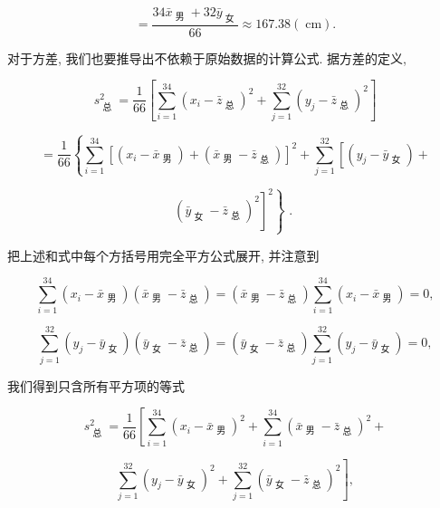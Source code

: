 \documentclass[10pt]{article}
\begin{document}
\[
= \frac{{34}{\bar{x}}_{\text{ 男 }} + {32}{\bar{y}}_{\text{ 女 }}}{66} \approx  {167.38}\left( \mathrm{\;{cm}}\right) .
\]

对于方差, 我们也要推导出不依赖于原始数据的计算公式. 据方差的定义,

\[
{s}_{\text{ 总 }}^{2} = \frac{1}{66}\left\lbrack  {\mathop{\sum }\limits_{{i = 1}}^{{34}}{\left( {x}_{i} - {\bar{z}}_{\text{ 总 }}\right) }^{2} + \mathop{\sum }\limits_{{j = 1}}^{{32}}{\left( {y}_{j} - {\bar{z}}_{\text{ 总 }}\right) }^{2}}\right\rbrack
\]

\[
= \frac{1}{66}\left\{  {\mathop{\sum }\limits_{{i = 1}}^{{34}}{\left\lbrack  \left( {x}_{i} - {\bar{x}}_{\text{ 男 }}\right)  + \left( {\bar{x}}_{\text{ 男 }} - {\bar{z}}_{\text{ 总 }}\right) \right\rbrack  }^{2} + \mathop{\sum }\limits_{{j = 1}}^{{32}}\left\lbrack  {\left( {{y}_{j} - {\bar{y}}_{\text{ 女 }}}\right)  + }\right. }\right.
\]

\[
\left. {\left. {\left( {\bar{y}}_{\text{ 女 }} - {\bar{z}}_{\text{ 总 }}\right) }^{2}\right\rbrack  }^{2}\right\}  \text{ . }
\]

把上述和式中每个方括号用完全平方公式展开, 并注意到

\[
\mathop{\sum }\limits_{{i = 1}}^{{34}}\left( {{x}_{i} - {\bar{x}}_{\text{ 男 }}}\right) \left( {{\bar{x}}_{\text{ 男 }} - {\bar{z}}_{\text{ 总 }}}\right)  = \left( {{\bar{x}}_{\text{ 男 }} - {\bar{z}}_{\text{ 总 }}}\right) \mathop{\sum }\limits_{{i = 1}}^{{34}}\left( {{x}_{i} - {\bar{x}}_{\text{ 男 }}}\right)  = 0,
\]

\[
\mathop{\sum }\limits_{{j = 1}}^{{32}}\left( {{y}_{j} - {\bar{y}}_{\text{ 女 }}}\right) \left( {{\bar{y}}_{\text{ 女 }} - {\bar{z}}_{\text{ 总 }}}\right)  = \left( {{\bar{y}}_{\text{ 女 }} - {\bar{z}}_{\text{ 总 }}}\right) \mathop{\sum }\limits_{{j = 1}}^{{32}}\left( {{y}_{j} - {\bar{y}}_{\text{ 女 }}}\right)  = 0,
\]

我们得到只含所有平方项的等式

\[
{s}_{\text{ 总 }}^{2} = \frac{1}{66}\left\lbrack  {\mathop{\sum }\limits_{{i = 1}}^{{34}}{\left( {x}_{i} - {\bar{x}}_{\text{ 男 }}\right) }^{2} + \mathop{\sum }\limits_{{i = 1}}^{{34}}{\left( {\bar{x}}_{\text{ 男 }} - {\bar{z}}_{\text{ 总 }}\right) }^{2} + }\right.
\]

\[
\left. {\mathop{\sum }\limits_{{j = 1}}^{{32}}{\left( {y}_{j} - {\bar{y}}_{\text{ 女 }}\right) }^{2} + \mathop{\sum }\limits_{{j = 1}}^{{32}}{\left( {\bar{y}}_{\text{ 女 }} - {\bar{z}}_{\text{ 总 }}\right) }^{2}}\right\rbrack  ,
\]
\end{document}
